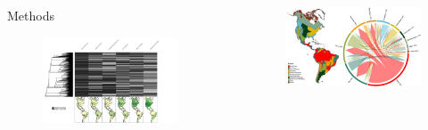 \documentclass[final]{beamer}
\newlength{\sepwid}
\newlength{\onecolwid}
\begin{document}
\begin{frame}[t]
\begin{columns}[t]
\begin{column}{\onecolwid}
\begin{block}{Methods}
\begin{figure}[h]
	\centering
	\includegraphics[width=\textwidth]{./figures/Trait_sampling}
	\caption{}
	\label{fig:sampling}
\end{figure}






	\end{block}

    \end{column}


    \begin{column}{\sepwid}\end{column}			%
    \begin{column}{\onecolwid}							%

\begin{figure}[h]
	\centering
	\includegraphics[width=\textwidth]{./figures/Figure1.pdf}
	\caption{}
	\label{fig:map}
\end{figure}



\end{column}
\end{columns}
\end{frame}
\end{document}
